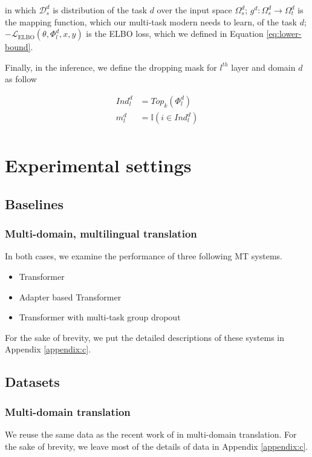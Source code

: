 \documentclass[11pt]{article}
\begin{document}
in which $\mathcal{D}_s^d$ is distribution of the task $d$ over the input space $\Omega^d_s$; $g^d: \Omega^d_s \rightarrow \Omega^d_t$ is the mapping function, which our multi-task modern needs to learn, of the task $d$; $-\mathcal{L}_{\text{ELBO}}(\theta,\Phi_l^d,x,y)$ is the ELBO loss, which we defined in Equation \ref{eq:lower-bound}.

Finally, in the inference, we define the dropping mask for $l^{th}$ layer and domain $d$ as follow

\begin{align*}
Ind_l^d &= Top_k(\Phi_l^d) \\
m_l^d &= \mathbb{I}(i\in Ind_l^d)\\
\end{align*}

\section{Experimental settings}
\subsection{Baselines}
\subsubsection{Multi-domain, multilingual translation}
In both cases, we examine the performance of three following MT systems.
\begin{itemize}
	\item Transformer
	\item Adapter based Transformer
	\item Transformer with multi-task group dropout
\end{itemize}
For the sake of brevity, we put the detailed descriptions of these systems in Appendix \ref{appendix:c}.
\subsection{Datasets}
\subsubsection{Multi-domain translation}
We reuse the same data as the recent work of \citet{Pham21revisiting} in multi-domain translation. For the sake of brevity, we leave most of the details of data in Appendix \ref{appendix:c}.
\end{document}
